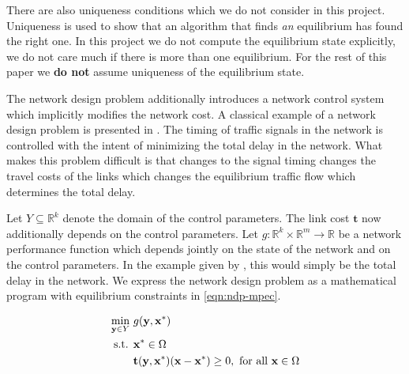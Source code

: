 There are also uniqueness conditions which we do not consider in this project.
Uniqueness is used to show that an algorithm that finds \textit{an} equilibrium has found the right one. 
In this project we do not compute the equilibrium state explicitly, we do not care much if there is more than one equilibrium. For the rest of this paper we \textbf{do not} assume uniqueness of the equilibrium state.


The network design problem additionally introduces a network control system which implicitly modifies the network cost.
A classical example of a network design problem is presented in \citet{sheffi1983optimal}.
The timing of traffic signals in the network is controlled with the intent of minimizing the total delay in the network.
What makes this problem difficult is that changes to the signal timing changes the travel costs of the links which changes the equilibrium traffic flow which determines the total delay.

Let $Y\subseteq \mathbb{R}^k$ denote the domain of the control parameters. The link cost $\mathbf{t}$ now additionally depends on the control parameters.
Let $g:\mathbb{R}^k\times \mathbb{R}^m\to \mathbb{R}$ be a network performance function which depends jointly on the state of the network and on the control parameters.
In the example given by \citet{sheffi1983optimal}, this would simply be the total delay in the network.
We express the network design problem as a mathematical program with equilibrium constraints in \eqref{eqn:ndp-mpec}.

\begin{subequations}
\begin{align}
    \min_{\mathbf{y}\in Y}\ & g(\mathbf{y}, \mathbf{x^*})\\
    \text{ s.t. } 
        & \mathbf{x^*} \in \Omega\\
        &  \mathbf{t}(\mathbf{y}, \mathbf{x^*})(\mathbf{x}- \mathbf{x^*}) \geq 0,\ \text{for all}\ \mathbf{x} \in \Omega
\end{align}\label{eqn:ndp-mpec}
\end{subequations}




